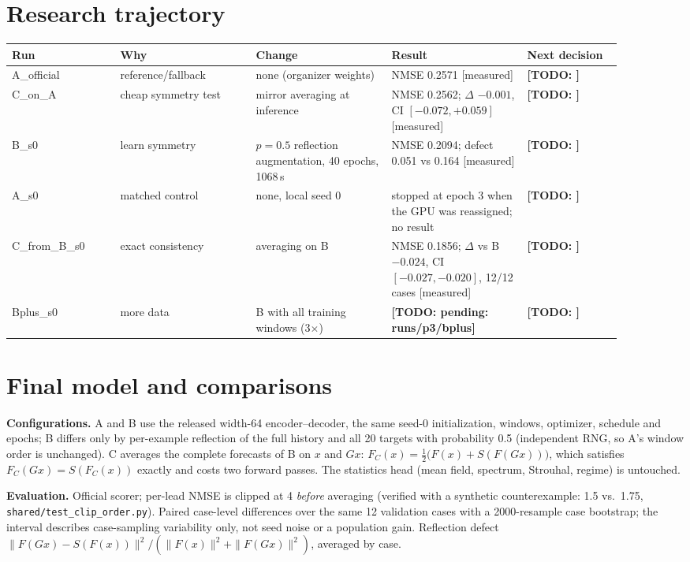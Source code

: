 \documentclass[11pt]{article}
\newcommand{\todo}[1]{\textbf{[TODO: #1]}}
\begin{document}
\section{Research trajectory}
\begin{tabular}{p{0.16\linewidth}p{0.2\linewidth}p{0.2\linewidth}p{0.2\linewidth}p{0.14\linewidth}}
\toprule
Run & Why & Change & Result & Next decision \\
\midrule
A\_official & reference/fallback & none (organizer weights) & NMSE 0.2571 [measured] & \todo{} \\
C\_on\_A & cheap symmetry test & mirror averaging at inference & NMSE 0.2562; $\Delta$ $-0.001$, CI $[-0.072,+0.059]$ [measured] & \todo{} \\
B\_s0 & learn symmetry & $p{=}0.5$ reflection augmentation, 40 epochs, 1068\,s & NMSE 0.2094; defect 0.051 vs 0.164 [measured] & \todo{} \\
A\_s0 & matched control & none, local seed 0 & stopped at epoch 3 when the GPU was reassigned; no result & \todo{} \\
C\_from\_B\_s0 & exact consistency & averaging on B & NMSE 0.1856; $\Delta$ vs B $-0.024$, CI $[-0.027,-0.020]$, 12/12 cases [measured] & \todo{} \\
Bplus\_s0 & more data & B with all training windows (3$\times$) & \todo{pending: runs/p3/bplus} & \todo{} \\
\bottomrule
\end{tabular}

\section{Final model and comparisons}
\textbf{Configurations.} A and B use the released width-64 encoder--decoder, the same seed-0
initialization, windows, optimizer, schedule and epochs; B differs only by per-example reflection of
the full history and all 20 targets with probability 0.5 (independent RNG, so A's window order is
unchanged). C averages the complete forecasts of B on $x$ and $Gx$:
$F_C(x)=\tfrac12\big(F(x)+S(F(Gx))\big)$, which satisfies $F_C(Gx)=S(F_C(x))$ exactly and costs
two forward passes. The statistics head (mean field, spectrum, Strouhal, regime) is untouched.

\textbf{Evaluation.} Official scorer; per-lead NMSE is clipped at 4 \emph{before} averaging (verified
with a synthetic counterexample: 1.5 vs.\ 1.75, \texttt{shared/test\_clip\_order.py}). Paired
case-level differences over the same 12 validation cases with a 2000-resample case bootstrap; the
interval describes case-sampling variability only, not seed noise or a population gain.
Reflection defect $\|F(Gx)-S(F(x))\|^2 / (\|F(x)\|^2+\|F(Gx)\|^2)$, averaged by case.
\end{document}
